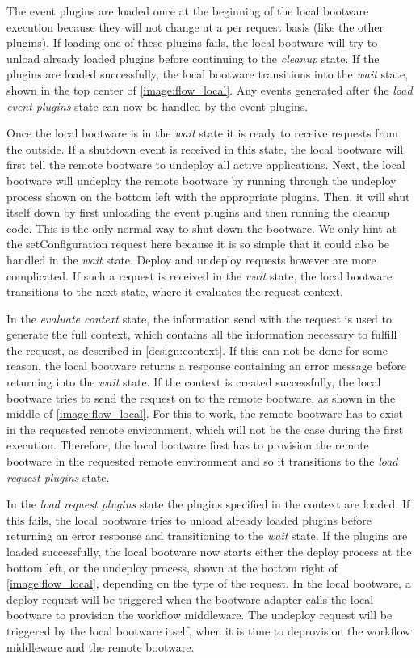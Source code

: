 The event plugins are loaded once at the beginning of the local bootware execution because they will not change at a per request basis (like the other plugins).
If loading one of these plugins fails, the local bootware will try to unload already loaded plugins before continuing to the \textit{cleanup} state.
If the plugins are loaded successfully, the local bootware transitions into the \textit{wait} state, shown in the top center of \autoref{image:flow_local}.
Any events generated after the \textit{load event plugins} state can now be handled by the event plugins.

Once the local bootware is in the \textit{wait} state it is ready to receive requests from the outside.
If a shutdown event is received in this state, the local bootware will first tell the remote bootware to undeploy all active applications.
Next, the local bootware will undeploy the remote bootware by running through the undeploy process shown on the bottom left with the appropriate plugins.
Then, it will shut itself down by first unloading the event plugins and then running the cleanup code.
This is the only normal way to shut down the bootware.
We only hint at the setConfiguration request here because it is so simple that it could also be handled in the \textit{wait} state.
Deploy and undeploy requests however are more complicated.
If such a request is received in the \textit{wait} state, the local bootware transitions to the next state, where it evaluates the request context.

In the \textit{evaluate context} state, the information send with the request is used to generate the full context, which contains all the information necessary to fulfill the request, as described in \autoref{design:context}.
If this can not be done for some reason, the local bootware returns a response containing an error message before returning into the \textit{wait} state.
If the context is created successfully, the local bootware tries to send the request on to the remote bootware, as shown in the middle of \autoref{image:flow_local}.
For this to work, the remote bootware has to exist in the requested remote environment, which will not be the case during the first execution.
Therefore, the local bootware first has to provision the remote bootware in the requested remote environment and so it transitions to the \textit{load request plugins} state.

In the \textit{load request plugins} state the plugins specified in the context are loaded.
If this fails, the local bootware tries to unload already loaded plugins before returning an error response and transitioning to the \textit{wait} state.
If the plugins are loaded successfully, the local bootware now starts either the deploy process at the bottom left, or the undeploy process, shown at the bottom right of \autoref{image:flow_local}, depending on the type of the request.
In the local bootware, a deploy request will be triggered when the bootware adapter calls the local bootware to provision the workflow middleware.
The undeploy request will be triggered by the local bootware itself, when it is time to deprovision the workflow middleware and the remote bootware.

